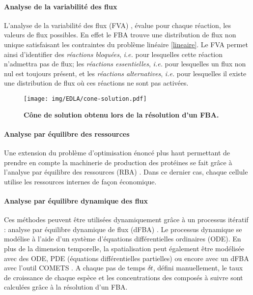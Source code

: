 \documentclass[../main.tex]{subfiles}
\begin{document}
\paragraph*{Analyse de la variabilité des flux}
L'analyse de la variabilité des flux (FVA) \citep{Mahadevan2003}, évalue pour chaque réaction, les valeurs de flux possibles. En effet le FBA trouve une distribution de flux non unique satisfaisant les contraintes du problème linéaire \eqref{lineaire}. Le FVA permet ainsi d'identifier des \textit{réactions bloquées}, \textit{i.e.} pour lesquelles cette réaction n'admettra pas de flux; les \textit{réactions essentielles}, \textit{i.e.} pour lesquelles un flux non nul est toujours présent, et les \textit{réactions alternatives}, \textit{i.e.} pour lesquelles il existe une distribution de flux où ces réactions ne sont pas activées.


\begin{figure}[h!]
    \centering
    \texttt{[image: img/EDLA/cone-solution.pdf]}
    \caption{\textbf{Cône de solution obtenu lors de la résolution d'un FBA.}}
    \label{fig:cone-solution}
\end{figure}


\paragraph*{Analyse par équilibre des ressources}
Une extension du problème d'optimisation énoncé plus haut permettant de prendre en compte la machinerie de production des protéines se fait grâce à l'analyse par équilibre des ressources (RBA) \citep{Goelzer2015}. Dans ce dernier cas, chaque cellule utilise les ressources internes de façon économique.

\paragraph*{Analyse par équilibre dynamique des flux}
Ces méthodes peuvent être utilisées dynamiquement grâce à un processus itératif : analyse par équilibre dynamique de flux (dFBA) \citep{Mahadevan2002}. Le processus dynamique se modélise à l'aide d'un système d'équations différentielles ordinaires (ODE).  En plus de la dimension temporelle, la spatialisation peut également être modélisée avec des ODE, PDE (équations différentielles partielles) \citep{Succurro} ou encore avec un dFBA avec l'outil COMETS \citep{Harcombe2014}. A chaque pas de temps $\delta t$, défini manuellement, le taux de croissance de chaque espèce et les concentrations des composés à suivre sont calculées grâce à la résolution d'un FBA. 
\end{document}
